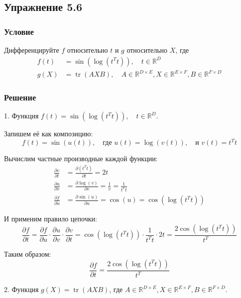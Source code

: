 \documentclass{article}
\begin{document}
\subsection*{Упражнение 5.6}

\subsubsection*{Условие}

Дифференцируйте \(f\) относительно \(t\) и \(g\) относительно \(X\), где
\begin{align*}
f(t) &= \sin(\log(t^T t)), \quad t \in \mathbb{R}^D \\
g(X) &= \operatorname{tr}(AXB), \quad A \in \mathbb{R}^{D \times E}, X \in \mathbb{R}^{E \times F}, B \in \mathbb{R}^{F \times D}
\end{align*}

\subsubsection*{Решение}

1. Функция \( f(t) = \sin(\log(t^T t)), \quad t \in \mathbb{R}^D \).

\quad

Запишем её как композицию:
\[
f(t) = \sin(u(t)), \quad \text{где } u(t) = \log(v(t)), \quad \text{и } v(t) = t^T t
\]

Вычислим частные производные каждой функции:
\begin{align*}
\frac{\partial v}{\partial t} &= \frac{\partial (t^T t)}{\partial t} = 2t \\
\frac{\partial u}{\partial v} &= \frac{\partial \log(v)}{\partial v} = \frac{1}{v} = \frac{1}{t^T t} \\
\frac{\partial f}{\partial u} &= \frac{\partial \sin(u)}{\partial u} = \cos(u) = \cos(\log(t^T t))
\end{align*}

И применим правило цепочки:
\[
\frac{\partial f}{\partial t} = \frac{\partial f}{\partial u} \cdot \frac{\partial u}{\partial v} \cdot \frac{\partial v}{\partial t} = \cos(\log(t^T t)) \cdot \frac{1}{t^T t} \cdot 2t = \frac{2\cos(\log(t^T t))}{t^T}
\]

Таким образом:
\[
\frac{\partial f}{\partial t} = \frac{2\cos(\log(t^T t))}{t^T}
\]

\quad

2. Функция \( g(X) = \operatorname{tr}(AXB) \), где \( A \in \mathbb{R}^{D \times E}, X \in \mathbb{R}^{E \times F}, B \in \mathbb{R}^{F \times D} \).
\end{document}
